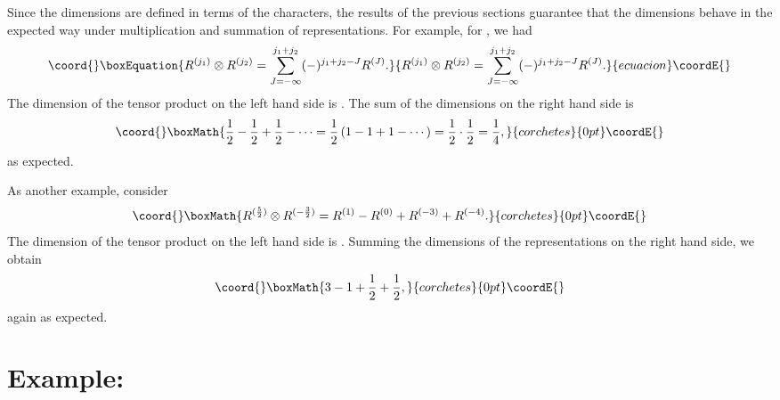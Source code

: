 \documentclass[a4paper,dvips,12pt]{article}
\providecommand {\half} {{1 \over 2}}
\begin{document}
    Since the dimensions are defined in terms of the characters,
    the results of the previous sections guarantee that the
    dimensions behave in the expected way under multiplication and
    summation of representations.  For example, for \coordHE{}, we
    had
    \begin{equation}\coord{}\boxEquation{
        R^{(j_1)}\otimes R^{(j_2)} = \sum_{J = -\infty}^{j_1 + j_2}
        (-)^{j_1 + j_2 - J} R^{(J)}.
    }{
        R^{(j_1)}\otimes R^{(j_2)} = \sum_{J = -\infty}^{j_1 + j_2}
        (-)^{j_1 + j_2 - J} R^{(J)}.
    }{ecuacion}\coordE{}\end{equation}
    The dimension of the tensor product on the left hand side is
    \myHighlight{$\half\cdot\half = {1\over 4}$}\coordHE{}.  The sum of the dimensions on
    the right hand side is
    \[\coord{}\boxMath{
        \half - \half + \half - \cdots = \half\, (1 - 1 + 1 - \cdots)
            = \half\cdot \half = {1\over 4},
    }{corchetes}{0pt}\coordE{}\]
    as expected.

    As another example, consider
    \[\coord{}\boxMath{
        R^{({5\over 2})}\otimes R^{(-{3\over 2})}
          = R^{(1)} - R^{(0)} + R^{(-3)} + R^{(-4)}.
    }{corchetes}{0pt}\coordE{}\]
    The dimension of the tensor product on the left hand side is
    \myHighlight{$6 \cdot \half = 3$}\coordHE{}.  Summing the dimensions of the representations
    on the right hand
    side, we obtain
    \[\coord{}\boxMath{
        3 - 1 + \half + \half,
    }{corchetes}{0pt}\coordE{}\]
    again as expected.

    \section{Example: \myHighlight{$R^{(1)}\otimes R^{(-\half)}$}\coordHE{}}
\end{document}
